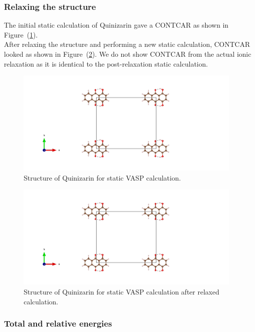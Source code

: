 \documentclass{article}
\begin{document}
    \subsubsection{Relaxing the structure}

      The initial static calculation of Quinizarin gave a CONTCAR as shown in Figure~(\ref{fig:basic_staticbefore_CONTCAR}). \\

      After relaxing the structure and performing a new static calculation, CONTCAR looked as shown in Figure~(\ref{fig:basic_staticafter_CONTCAR}). We do not show CONTCAR from the actual ionic relaxation as it is identical to the post-relaxation static calculation.


      \begin{figure}[H]
        \centering
        \includegraphics[width = 11cm]{../fig/basic_staticbefore_CONTCAR.png}
        \caption{Structure of Quinizarin for static VASP calculation. }
        \label{fig:basic_staticbefore_CONTCAR}
      \end{figure}

      \begin{figure}[H]
        \centering
        \includegraphics[width = 11cm]{../fig/basic_staticafter_CONTCAR.png}
        \caption{Structure of Quinizarin for static VASP calculation after relaxed calculation. }
        \label{fig:basic_staticafter_CONTCAR}
      \end{figure}


    \subsubsection{Total and relative energies}
\end{document}
